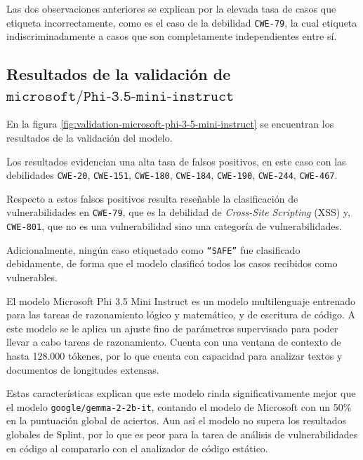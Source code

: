 \documentclass[12pt, a4paper, twoside]{article}
\begin{document}
Las dos observaciones anteriores se explican por la elevada tasa de casos que etiqueta incorrectamente, como es el caso de la debilidad \texttt{CWE-79}, la cual etiqueta indiscriminadamente a casos que son completamente independientes entre sí.

\subsection{Resultados de la validación de $\texttt{microsoft/Phi-3.5-mini-instruct}$}
En la figura \ref{fig:validation-microsoft-phi-3-5-mini-instruct} se encuentran los resultados de la validación del modelo.

Los resultados evidencian una alta tasa de falsos positivos, en este caso con las debilidades \texttt{CWE-20}, \texttt{CWE-151}, \texttt{CWE-180}, \texttt{CWE-184}, \texttt{CWE-190}, \texttt{CWE-244}, \texttt{CWE-467}.

Respecto a estos falsos positivos resulta reseñable la clasificación de vulnerabilidades en \texttt{CWE-79}, que es la debilidad de \textit{Cross-Site Scripting} (XSS) y, \texttt{CWE-801}, que no es una vulnerabilidad sino una categoría de vulnerabilidades.

Adicionalmente, ningún caso etiquetado como \texttt{\enquote{SAFE}} fue clasificado debidamente, de forma que el modelo clasificó todos los casos recibidos como vulnerables.

El modelo Microsoft Phi 3.5 Mini Instruct es un modelo multilenguaje entrenado para las tareas de razonamiento lógico y matemático, y de escritura de código. A este modelo se le aplica un ajuste fino de parámetros supervisado para poder llevar a cabo tareas de razonamiento. Cuenta con una ventana de contexto de hasta 128.000 tókenes, por lo que cuenta con capacidad para analizar textos y documentos de longitudes extensas. \cite{abdin-2024}

Estas características explican que este modelo rinda significativamente mejor que el modelo \texttt{google/gemma-2-2b-it}, contando el modelo de Microsoft con un 50\% en la puntuación global de aciertos. Aun así el modelo no supera los resultados globales de Splint, por lo que es peor para la tarea de análisis de vulnerabilidades en código al compararlo con el analizador de código estático.
\end{document}
